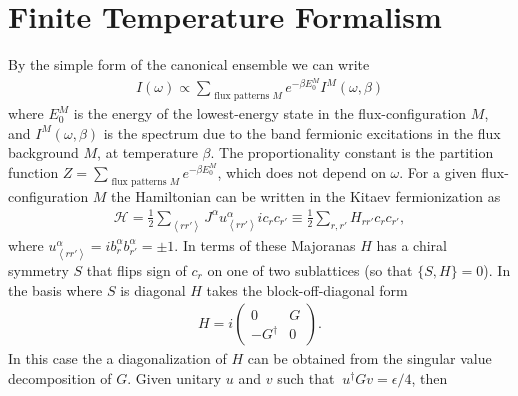 \documentclass[reprint,amsmath,amssymb,aps,prl,groupedaddress,nofootinbib,superscriptaddress]{revtex4-1}
\newcommand{\1}{\mathds{1}}
\begin{document}


\onecolumngrid
\appendix


\section{Finite Temperature Formalism} 
By the simple form of the canonical ensemble we can write 
\begin{align}\label{iflux}
I(\omega) \propto \sum_{\text{ flux patterns } M}  e^{-\beta E_0^M} I^M(\omega,\beta)
\end{align}
where $E_0^M$ is the energy of the lowest-energy state in the flux-configuration $M$, and $I^M(\omega,\beta)$ is the spectrum due to the band fermionic excitations in the flux background $M$, at temperature $\beta$. The proportionality constant is the partition function $Z = \sum_{\text{ flux patterns } M} e^{-\beta E_0^M}$, which does not depend on $\omega$. For a given flux-configuration $M$ the Hamiltonian can be written in the Kitaev fermionization %
as
\begin{align}
\mathcal{H} =  \frac{1}{2}\sum_{\left<rr'\right>} J^{\alpha} u^\alpha_{\left<rr'\right>} i c_r c_{r'} \equiv  \frac{1}{2}\sum_{r,r'} H_{rr'} c_r c_{r'},
\end{align}
where $u^\alpha_{\left<rr'\right>} = i b^\alpha_r b^\alpha_{r'} = \pm 1$. 
In terms of these Majoranas $H$ has a chiral symmetry $S$ that flips sign of $c_r$ on one of two sublattices (so that $\{S,H\} = 0$). %
In the basis where $S$ is diagonal $H$ takes the block-off-diagonal form
\begin{align}
H = i\left(\begin{array}{cc}
0 & G \\
-G^\dag & 0
\end{array}\right).
\end{align}
In this case the a diagonalization of $H$ can be obtained from the singular value decomposition of $G$. Given unitary $u$ and $v$ %
such that \mbox{$\ u^\dagger G v = \epsilon/4$}, then  %
\end{document}
